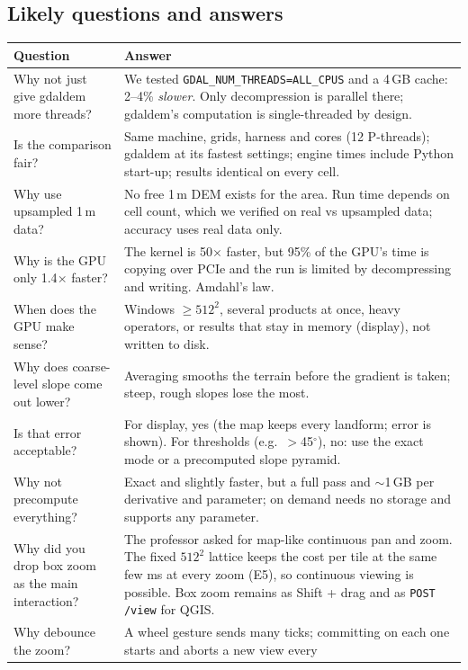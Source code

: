 ﻿\documentclass[11pt,a4paper]{article}
\newcommand{\code}[1]{\texttt{#1}}
\begin{document}
\subsection{Likely questions and answers}
\begin{longtable}{>{\raggedright\arraybackslash}p{5.2cm}>{\raggedright\arraybackslash}p{10.2cm}}
\toprule
Question & Answer \\
\midrule
\endhead
Why not just give gdaldem more threads? & We tested \code{GDAL\_NUM\_THREADS=ALL\_CPUS} and a 4\,GB cache: 2--4\% \emph{slower}. Only
decompression is parallel there; gdaldem's computation is single-threaded by design. \\
Is the comparison fair? & Same machine, grids, harness and cores (12 P-threads); gdaldem at its fastest settings; engine times
include Python start-up; results identical on every cell. \\
Why use upsampled 1\,m data? & No free 1\,m DEM exists for the area. Run time depends on cell count, which we verified on real vs
upsampled data; accuracy uses real data only. \\
Why is the GPU only 1.4$\times$ faster? & The kernel is 50$\times$ faster, but 95\% of the GPU's time is copying over PCIe and the
run is limited by decompressing and writing. Amdahl's law. \\
When does the GPU make sense? & Windows $\geq512^2$, several products at once, heavy operators, or results that stay in memory
(display), not written to disk. \\
Why does coarse-level slope come out lower? & Averaging smooths the terrain before the gradient is taken; steep, rough slopes lose
the most. \\
Is that error acceptable? & For display, yes (the map keeps every landform; error is shown). For thresholds (e.g.\ $>$45$^\circ$),
no: use the exact mode or a precomputed slope pyramid. \\
Why not precompute everything? & Exact and slightly faster, but a full pass and $\sim$1\,GB per derivative and parameter; on demand
needs no storage and supports any parameter. \\
Why did you drop box zoom as the main interaction? & The professor asked for map-like continuous pan and zoom. The fixed
$512^2$ lattice keeps the cost per tile at the same few ms at every zoom (E5), so continuous viewing is possible. Box zoom
remains as Shift + drag and as \code{POST /view} for QGIS. \\
Why debounce the zoom? & A wheel gesture sends many ticks; committing on each one starts and aborts a new view every

\end{longtable}
\end{document}
